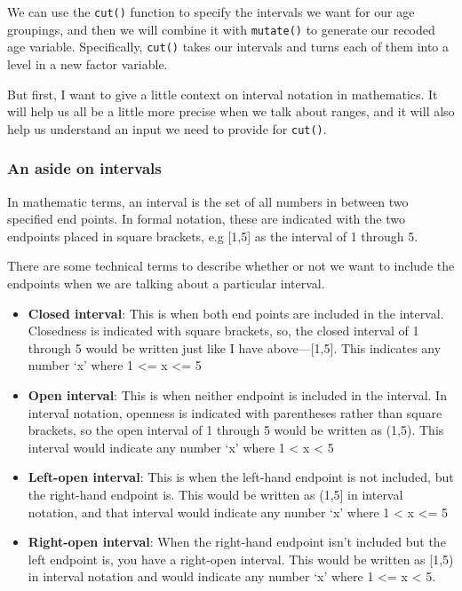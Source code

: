 \documentclass[
  letterpaper,
  DIV=11,
  numbers=noendperiod]{scrreprt}
\begin{document}
We can use the \texttt{cut()} function to specify the intervals we want
for our age groupings, and then we will combine it with
\texttt{mutate()} to generate our recoded age variable. Specifically,
\texttt{cut()} takes our intervals and turns each of them into a level
in a new factor variable.

But first, I want to give a little context on interval notation in
mathematics. It will help us all be a little more precise when we talk
about ranges, and it will also help us understand an input we need to
provide for \texttt{cut()}.

\subsubsection{An aside on intervals}\label{an-aside-on-intervals}

In mathematic terms, an interval is the set of all numbers in between
two specified end points. In formal notation, these are indicated with
the two endpoints placed in square brackets, e.g {[}1,5{]} as the
interval of 1 through 5.

There are some technical terms to describe whether or not we want to
include the endpoints when we are talking about a particular interval.

\begin{itemize}
\item
  \textbf{Closed interval}: This is when both end points are included in
  the interval. Closedness is indicated with square brackets, so, the
  closed interval of 1 through 5 would be written just like I have
  above---{[}1,5{]}. This indicates any number `x' where 1 \textless= x
  \textless= 5
\item
  \textbf{Open interval}: This is when neither endpoint is included in
  the interval. In interval notation, openness is indicated with
  parentheses rather than square brackets, so the open interval of 1
  through 5 would be written as (1,5). This interval would indicate any
  number `x' where 1 \textless{} x \textless{} 5
\item
  \textbf{Left-open interval}: This is when the left-hand endpoint is
  not included, but the right-hand endpoint is. This would be written as
  (1,5{]} in interval notation, and that interval would indicate any
  number `x' where 1 \textless{} x \textless= 5
\item
  \textbf{Right-open interval}: When the right-hand endpoint isn't
  included but the left endpoint is, you have a right-open interval.
  This would be written as {[}1,5) in interval notation and would
  indicate any number `x' where 1 \textless= x \textless{} 5.
\end{itemize}
\end{document}
